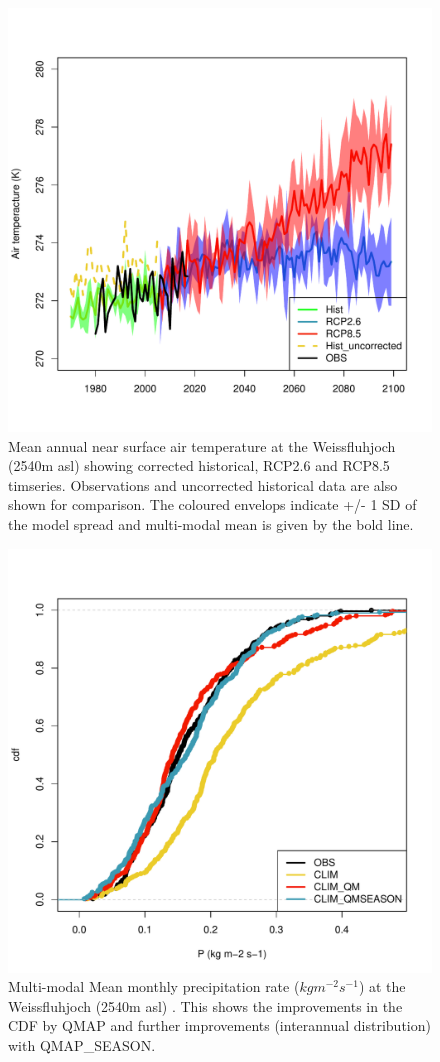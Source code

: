 \documentclass[hess, manuscript]{copernicus}
\begin{document}
\begin{figure}[t]
\includegraphics[width=12cm]{"plots/TA_TS.pdf"}
\caption{Mean annual near surface air temperature at the Weissfluhjoch (2540m asl)  showing corrected historical, RCP2.6 and RCP8.5 timseries. Observations and uncorrected historical data are also shown for comparison. The coloured envelops indicate +/- 1 SD of the model spread and multi-modal mean is given by the bold line. }
\end{figure}

\begin{figure}[t]
\includegraphics[width=12cm]{"plots/P_CDF.pdf"}
\caption{Multi-modal Mean monthly precipitation rate ($kg m^{-2} s^{-1}$) at the Weissfluhjoch (2540m asl) . This shows the improvements in the CDF by QMAP and further improvements (interannual distribution) with QMAP_SEASON. }
\end{figure}
\end{document}
